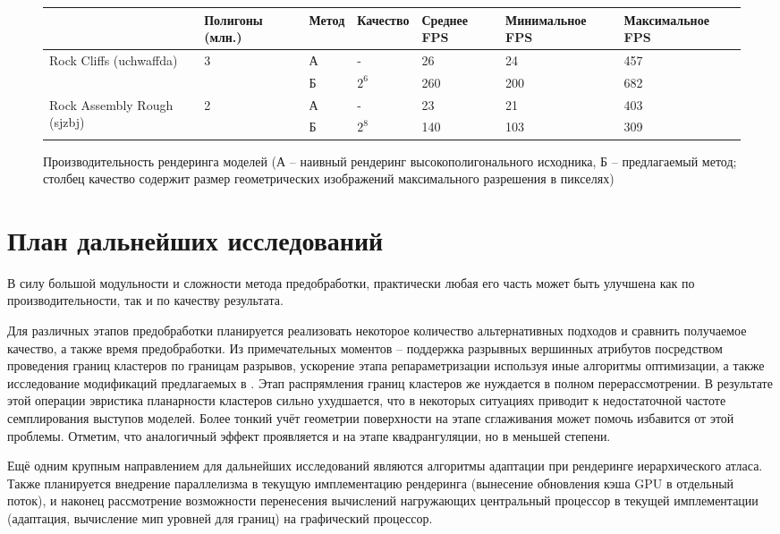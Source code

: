 \documentclass[12pt]{extarticle}
\begin{document}
\begin{figure}[ht]
\small
\centering
\begin{tabular}{ l | p{16mm} | p{10mm} | p{15mm} | p{14mm} | p{23mm} | p{23mm} }
                        & Полигоны (млн.) & Метод & Качество & Среднее FPS & Минимальное FPS & Максимальное FPS \\
\hline
\multirow{2}{18mm}{Rock Cliffs (uchwaffda)}
& \multirow{2}{16mm}{3}
 & А &   -   & 26 & 24 & 457 \\
&& Б & $2^6$ & 260 & 200 & 682 \\
\hline
\multirow{2}{26mm}{Rock Assembly Rough (sjzbj)}
& \multirow{2}{16mm}{2}
 & А &   -   & 23 & 21 & 403 \\
&& Б & $2^8$ & 140 & 103 & 309 \\
\end{tabular}
\caption{Производительность рендеринга моделей (А -- наивный рендеринг высокополигонального исходника, Б -- предлагаемый метод; столбец качество содержит размер геометрических изображений максимального разрешения в пикселях)}
\end{figure}


\section{План дальнейших исследований}
В силу большой модульности и сложности метода предобработки, практически любая его часть может быть улучшена как по производительности, так и по качеству результата.

Для различных этапов предобработки планируется реализовать некоторое количество альтернативных подходов и сравнить получаемое качество, а также время предобработки. Из примечательных моментов -- поддержка разрывных вершинных атрибутов посредством проведения границ кластеров по границам разрывов, ускорение этапа репараметризации используя иные алгоритмы оптимизации, а также исследование модификаций предлагаемых в \cite{feng2010feature}. Этап распрямления границ кластеров же нуждается в полном перерассмотрении. В результате этой операции эвристика планарности кластеров сильно ухудшается, что в некоторых ситуациях приводит к недостаточной частоте семплирования выступов моделей. Более тонкий учёт геометрии поверхности на этапе сглаживания может помочь избавится от этой проблемы. Отметим, что аналогичный эффект проявляется и на этапе квадрангуляции, но в меньшей степени.

Ещё одним крупным направлением для дальнейших исследований являются алгоритмы адаптации при рендеринге иерархического атласа. Также планируется внедрение параллелизма в текущую имплементацию рендеринга (вынесение обновления кэша GPU в отдельный поток), и наконец рассмотрение возможности перенесения вычислений нагружающих центральный процессор в текущей имплементации (адаптация, вычисление мип уровней для границ) на графический процессор.


\newpage

\end{document}
